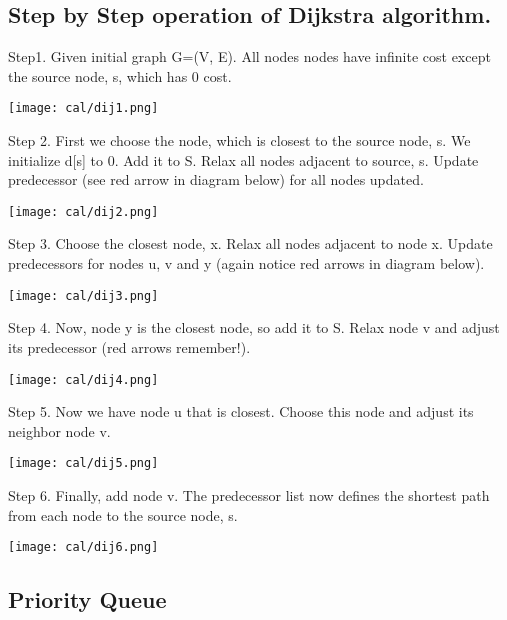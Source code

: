 \documentclass{article}
\begin{document}
\subsection{Step by Step operation of Dijkstra algorithm.}
Step1. Given initial graph G=(V, E). All nodes nodes have infinite cost except the source node, s,  which has 0 cost.

\texttt{[image: cal/dij1.png]} 

Step 2. First we choose the node, which is closest to the source node, s. We initialize d[s] to 0. Add it to S. Relax all nodes adjacent to source, s. Update predecessor (see red arrow in diagram below) for all nodes updated.

\texttt{[image: cal/dij2.png]}

Step 3. Choose the closest node, x. Relax all nodes adjacent to node x. Update predecessors for nodes u, v and y (again notice red arrows in diagram below).

\texttt{[image: cal/dij3.png]} 

Step 4. Now, node y is the closest node, so add it to S. Relax node v and adjust its predecessor (red arrows remember!).

\texttt{[image: cal/dij4.png]}

Step 5. Now we have node u that is closest. Choose this node and adjust its neighbor node v.

\texttt{[image: cal/dij5.png]}  

Step 6. Finally, add node v. The predecessor list now defines the shortest path from each node to the source node, s.

\texttt{[image: cal/dij6.png]} 
\newpage
\subsection{Priority Queue}
\end{document}

